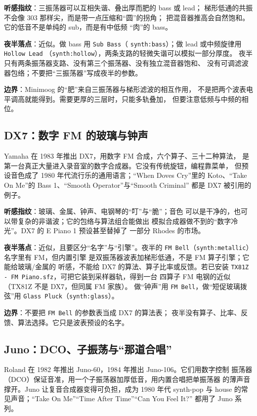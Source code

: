 \textbf{听感指纹}：三振荡器可以互相失谐、叠出厚而肥的 bass 或 lead；
梯形低通的共振不会像 303 那样尖，而是带一点压缩和“圆”的拐角；
把混音器推高会自然饱和。它的低音不是单纯的 sub，而是有中低频
“肉”的 bass。

\textbf{夜半落点}：近似。做 bass 用 \texttt{Sub Bass}（
\texttt{synth:bass}）；做 lead 或中频旋律用 \texttt{Hollow Lead}
（\texttt{synth:hollow}），两条支路的轻微失谐可以模拟一部分厚度。
夜半只有两条振荡器支路、没有第三个振荡器、没有独立混音器饱和、
没有可调滤波器包络；不要把“三振荡器”写成夜半的参数。

\textbf{边界}：Minimoog 的“肥”来自三振荡器与梯形滤波的相互作用，
不是把两个波表电平调高就能得到。需要更厚的三层时，只能多轨叠加，
但要注意低频与中频的相位。

\subsection{DX7：数字 FM 的玻璃与钟声}
\label{sec:iconic-dx7}

Yamaha 在 1983 年推出 DX7，用数字 FM 合成，六个算子、三十二种算法，
是第一台真正大量进入录音室的数字合成器。它没有传统旋钮，编程靠菜单，
但预设音色成了 1980 年代流行乐的通用语言；“When Doves Cry”里的
Koto、“Take On Me”的 Bass 1、“Smooth Operator”与“Smooth Criminal”
都是 DX7 被引用的例子。

\textbf{听感指纹}：玻璃、金属、钟声、电钢琴的“叮”与“脆”；音色
可以是干净的，也可以带复杂的非谐波；它的包络与算法组合能做出
模拟合成器做不到的“数字冷光”。DX7 的 E Piano 1 预设甚至替掉了
一部分 Rhodes 的市场。

\textbf{夜半落点}：近似，且要区分“名字”与“引擎”。夜半的
\texttt{FM Bell}（\texttt{synth:metallic}）名字里有 FM，但内置引擎
是双振荡器波表加梯形低通，不是 FM 算子引擎；它能给玻璃/金属的
听感，不能给 DX7 的算法、算子比率或反馈。若已安装
\texttt{TX81Z - FM Piano.sfz}，可把它装到采样器轨，得到一台
四算子 FM 电钢的近似（TX81Z 不是 DX7，但同属 FM 家族）。
做“钟声”用 \texttt{FM Bell}，做“短促玻璃拨弦”用
\texttt{Glass Pluck}（\texttt{synth:glass}）。

\textbf{边界}：不要把 \texttt{FM Bell} 的参数表当成 DX7 的算法表；
夜半没有算子、比率、反馈、算法选择。它只是波表预设的名字。

\subsection{Juno：DCO、子振荡与“那道合唱”}
\label{sec:iconic-juno}

Roland 在 1982 年推出 Juno-60，1984 年推出 Juno-106。它们用数字控制
振荡器（DCO）保证音准，用一个子振荡器加厚低音，用内置合唱把单振荡器
的薄声音撑开。Juno 让复音合成器变得可负担，成为 1980 年代 synth-pop
与 house 的常见声音；“Take On Me”“Time After Time”“Can You Feel It?”
都用了 Juno 系列。

